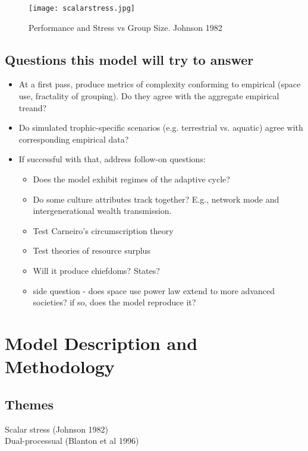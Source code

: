 \documentclass[11pt,oneside,a4paper,onecolumn]{article}
\begin{document}
\begin{figure}[htp]
 \centering
  \texttt{[image: scalarstress.jpg]}
\caption[ ]{Performance and Stress vs Group Size. Johnson 1982}
 \label{scalarstress}
\end{figure}

\FloatBarrier

\subsection{Questions this model will try to answer}
\begin{itemize}
	\item At a first pass, produce metrics of complexity conforming to empirical (space use, fractality of grouping).  Do they agree with the aggregate empirical treand?  
	\item Do simulated trophic-specific scenarios (e.g. terrestrial vs. aquatic) agree with corresponding empirical data?
	\item If successful with that, address follow-on questions:
	\begin{itemize}
		\item Does the model exhibit regimes of the adaptive cycle?
		\item Do some culture attributes track together?  E.g., network mode and intergenerational wealth transmission.
		\item Test Carneiro's circumscription theory
		\item Test theories of resource surplus 
		\item Will it produce chiefdoms?  States?
		\item side question - does space use power law extend to more advanced societies?  if so, does the model reproduce it?
	\end{itemize}
\end{itemize}

\section{Model Description and Methodology}

\subsection{Themes}

Scalar stress (Johnson 1982) \\
Dual-processual (Blanton et al 1996)  \\
\end{document}
